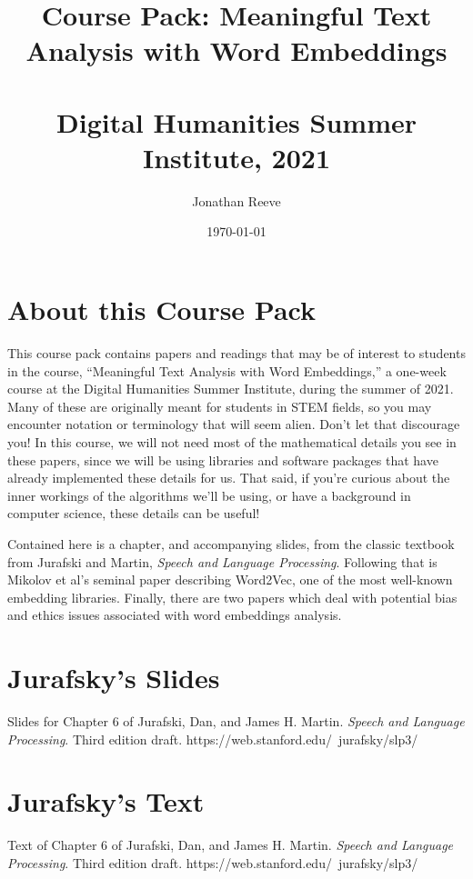 \documentclass[a4paper]{book}
\title{Course Pack: Meaningful Text Analysis with Word Embeddings \\ \\
  Digital Humanities Summer Institute, 2021}
\author{Jonathan Reeve}
\date{\today}
\begin{document}
\maketitle

\tableofcontents

\chapter{About this Course Pack}

This course pack contains papers and readings that may be of interest to students in the course, ``Meaningful Text Analysis with Word Embeddings,'' a one-week course at the Digital Humanities Summer Institute, during the summer of 2021. Many of these are originally meant for students in STEM fields, so you may encounter notation or terminology that will seem alien. Don't let that discourage you! In this course, we will not need most of the mathematical details you see in these papers, since we will be using libraries and software packages that have already implemented these details for us. That said, if you're curious about the inner workings of the algorithms we'll be using, or have a background in computer science, these details can be useful!

Contained here is a chapter, and accompanying slides, from the classic textbook from Jurafski and Martin, \emph{Speech and Language Processing}. Following that is Mikolov et al's seminal paper describing Word2Vec, one of the most well-known embedding libraries. Finally, there are two papers which deal with potential bias and ethics issues associated with word embeddings analysis.

\chapter{Jurafsky's Slides}

Slides for Chapter 6 of Jurafski, Dan, and James H. Martin. \emph{Speech and Language Processing}. Third edition draft. https://web.stanford.edu/~jurafsky/slp3/

  

\chapter{Jurafsky's Text}

Text of Chapter 6 of Jurafski, Dan, and James H. Martin. \emph{Speech and Language Processing}. Third edition draft. https://web.stanford.edu/~jurafsky/slp3/
\end{document}
